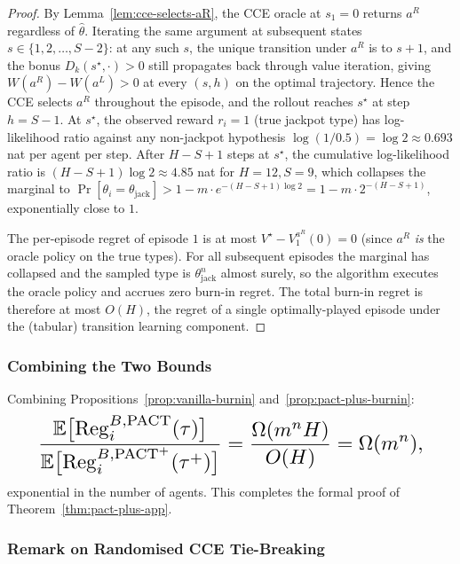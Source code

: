 \begin{proof}
By Lemma~\ref{lem:cce-selects-aR}, the CCE oracle at $s_1 = 0$ returns $a^R$ regardless of $\hat\theta$. Iterating the same argument at subsequent states $s \in \{1, 2, \ldots, S-2\}$: at any such $s$, the unique transition under $a^R$ is to $s+1$, and the bonus $D_k(s^\star, \cdot) > 0$ still propagates back through value iteration, giving $W(a^R) - W(a^L) > 0$ at every $(s, h)$ on the optimal trajectory. Hence the CCE selects $a^R$ throughout the episode, and the rollout reaches $s^\star$ at step $h = S - 1$. At $s^\star$, the observed reward $r_i = 1$ (true jackpot type) has log-likelihood ratio against any non-jackpot hypothesis $\log(1 / 0.5) = \log 2 \approx 0.693$ nat per agent per step. After $H - S + 1$ steps at $s^\star$, the cumulative log-likelihood ratio is $(H - S + 1) \log 2 \approx 4.85$ nat for $H = 12, S = 9$, which collapses the marginal to $\Pr[\theta_i = \theta_{\mathrm{jack}}] > 1 - m \cdot e^{-(H-S+1)\log 2} = 1 - m \cdot 2^{-(H-S+1)}$, exponentially close to $1$.

The per-episode regret of episode $1$ is at most $V^\star - V^{a^R}_1(0) = 0$ (since $a^R$ \emph{is} the oracle policy on the true types). For all subsequent episodes the marginal has collapsed and the sampled type is $\theta_{\mathrm{jack}}^n$ almost surely, so the algorithm executes the oracle policy and accrues zero burn-in regret. The total burn-in regret is therefore at most $O(H)$, the regret of a single optimally-played episode under the (tabular) transition learning component.
\end{proof}

\subsubsection{Combining the Two Bounds}
\label{app:pact-plus-combine}

Combining Propositions~\ref{prop:vanilla-burnin} and~\ref{prop:pact-plus-burnin}:
\begin{equation}\resizebox{0.9\linewidth}{!}{$\displaystyle \frac{\mathbb{E}\big[\mathrm{Reg}_i^{B, \text{PACT}}(\tau)\big]}{\mathbb{E}\big[\mathrm{Reg}_i^{B, \text{PACT}^+}(\tau^+)\big]} = \frac{\Omega(m^n H)}{O(H)} = \Omega(m^n), $}\end{equation}
exponential in the number of agents. This completes the formal proof of Theorem~\ref{thm:pact-plus-app}.

\subsubsection{Remark on Randomised CCE Tie-Breaking}

